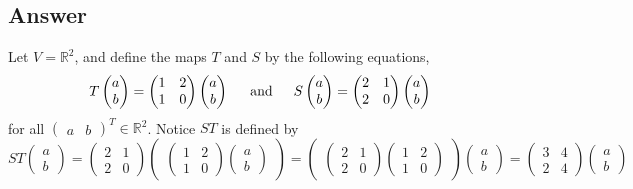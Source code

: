 \documentclass[
	12pt, %
]{fphw}
\newcommand\0{\mathbf{0}}
\newcommand\R[1]{\text{$\mathbb{R}^{#1}$}}
\begin{document}
\subsection*{Answer} 
Let $V = \R{2}$, and define the maps $T$ and $S$ by the following equations,
$$
T \begin{pmatrix}a \\ b\end{pmatrix} = \begin{pmatrix}1 & 2\\1 & 0\end{pmatrix}\begin{pmatrix}a \\ b\end{pmatrix} \hspace{15 pt}\text{and}\hspace{15 pt} S \begin{pmatrix}a \\ b\end{pmatrix} = \begin{pmatrix}2 & 1\\2 & 0\end{pmatrix}\begin{pmatrix}a \\ b\end{pmatrix}
$$
for all $\begin{pmatrix}a & b\end{pmatrix}^T \in \R{2}$. Notice $ST$ is defined by
$$
ST \begin{pmatrix}a \\ b\end{pmatrix} = \begin{pmatrix}2 & 1\\2 & 0\end{pmatrix} \begin{pmatrix}\begin{pmatrix}1 & 2\\1 & 0\end{pmatrix} \begin{pmatrix}a \\ b\end{pmatrix}\end{pmatrix} =  \begin{pmatrix}\begin{pmatrix}2 & 1\\2 & 0\end{pmatrix} \begin{pmatrix}1 & 2\\1 & 0\end{pmatrix}\end{pmatrix} \begin{pmatrix}a \\ b\end{pmatrix} = \begin{pmatrix}3&4\\2&4\end{pmatrix}\begin{pmatrix}a \\ b\end{pmatrix}
$$
\end{document}

